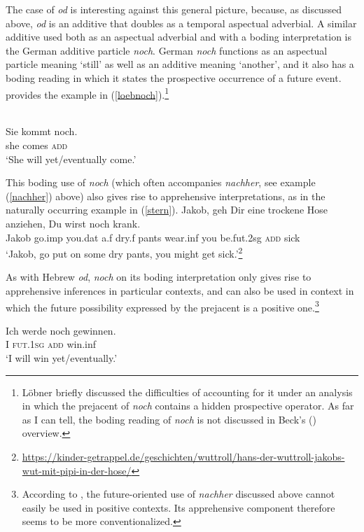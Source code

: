 \documentclass[output=paper,colorlinks,citecolor=brown]{langscibook}
\begin{document}
The case of \textit{od} is interesting against this general picture, because, as discussed above, \textit{od} is an additive that doubles as a temporal aspectual adverbial. A similar additive used both as an aspectual adverbial and with a boding interpretation is the German additive particle \textit{noch}. German \textit{noch} functions as an aspectual  particle meaning `still' as well as an additive meaning `another', and it also has a boding reading in which it states the prospective occurrence of a future event. \citet{lobner89} provides the example in (\ref{loebnoch}).\footnote{L\"{o}bner briefly discussed the difficulties of accounting for it under an analysis in which the prejacent of \textit{noch} contains a hidden prospective operator. As far as I can tell, the boding reading of \textit{noch} is not discussed in  Beck's (\citeyear{beck20}) overview.}

\ea
\label{loebnoch}  \\
\gll Sie kommt noch. \\
she comes \textsc{add} \\
\glt `She will yet/eventually come.'
\z

This boding use of \textit{noch} (which often accompanies \textit{nachher}, see example (\ref{nachher}) above) also gives rise to apprehensive interpretations, as in the naturally occurring example in (\ref{stern}). 
\ea
\label{stern}
\gll Jakob, geh Dir eine trockene Hose anziehen, Du wirst noch krank. \\
Jakob go.{\sc imp} you.{\sc dat} a.{\sc f} dry.{\sc f} pants wear.{\sc inf} you be.{\sc fut.2sg} \textsc{add} sick \\
\glt `Jakob, go put on some dry pants, you might get sick.'\footnote{\url{https://kinder-getrappel.de/geschichten/wuttroll/hans-der-wuttroll-jakobs-wut-mit-pipi-in-der-hose/}}
\z

 As with Hebrew \textit{od}, \textit{noch} on its boding interpretation only gives rise to apprehensive inferences in particular contexts, and can also be used in context in which the future possibility expressed by the prejacent is a positive one.\footnote{According to \citet{angelo-berndt16}, the future-oriented use of \textit{nachher} discussed above cannot easily be used in positive contexts. Its apprehensive component therefore seems to be more conventionalized.} 

\ea
\label{winen}
\gll Ich werde noch gewinnen. \\
I \textsc{fut.1sg} \textsc{add} win.{\sc inf} \\
\glt `I will win yet/eventually.'
\z
\end{document}
